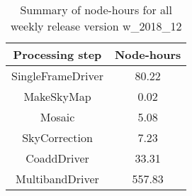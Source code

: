 \begin{table}[h]
  \centering
  \begin{tabular} {|c|c|}
    \hline
    Processing step & Node-hours \\
    \hline
    SingleFrameDriver &  80.22 \\ 
    MakeSkyMap        &   0.02 \\
    Mosaic            &   5.08 \\
    SkyCorrection     &   7.23 \\
    CoaddDriver       &  33.31 \\
    MultibandDriver   & 557.83 \\
    \hline
  \end{tabular}
  \caption{Summary of node-hours for all weekly release version w\_2018\_12}
  \label{tbl:PerTask12}
\end{table}
